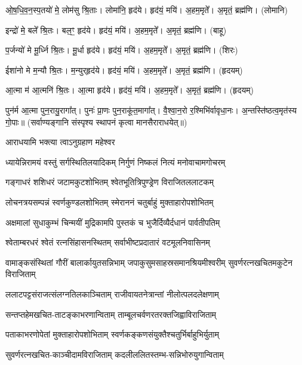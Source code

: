   ओ॒ष॒धि॒व॒न॒स्प॒तयो॑ मे॒ लोम॑सु श्रि॒ताः। लोमा॑नि॒ हृद॑ये। हृद॑यं॒ मयि॑। अ॒हम॒मृते᳚। अ॒मृतं॒ ब्रह्म॑णि। (लोमानि)

  इन्द्रो॑ मे॒ बले᳚ श्रि॒तः। बल॒ꣳ॒ हृद॑ये। हृद॑यं॒ मयि॑। अ॒हम॒मृते᳚। अ॒मृतं॒ ब्रह्म॑णि। (बाहू)

  प॒र्जन्यो॑ मे मू॒र्ध्नि श्रि॒तः। मू॒र्धा हृद॑ये। हृद॑यं॒ मयि॑। अ॒हम॒मृते᳚। अ॒मृतं॒ ब्रह्म॑णि। (शिरः)

  ईशा॑नो मे म॒न्यौ श्रि॒तः। म॒न्युर्‌हृद॑ये। हृद॑यं॒ मयि॑। अ॒हम॒मृते᳚। अ॒मृतं॒ ब्रह्म॑णि। (हृदयम्)

  आ॒त्मा म॑ आ॒त्मनि॑ श्रि॒तः। आ॒त्मा हृद॑ये। हृद॑यं॒ मयि॑। अ॒हम॒मृते᳚। अ॒मृतं॒ ब्रह्म॑णि।
(हृदयम्)

  पुन॑र्म आ॒त्मा पुन॒रायु॒रागा᳚त्। पुनः॑ प्रा॒णः पुन॒राकू॑त॒मागा᳚त्। वै॒श्वा॒न॒रो र॒श्मिभि॑र्वावृधा॒नः। अ॒न्तस्ति॑ष्ठत्व॒मृत॑स्य गो॒पाः॥ (सर्वाण्यङ्गानि संस्पृश्य स्थापनं कृत्वा मानसैराराधयेत्॥)

{\small\closesection}


{आराधयामि भक्त्या त्वाऽनुग्रहाण महेश्वर}



\twolineshloka
{ध्यायेन्निरामयं वस्तुं सर्गस्थितिलयादिकम्}
{निर्गुणं निष्कलं नित्यं मनोवाचामगोचरम्}

\twolineshloka
{गङ्गाधरं शशिधरं जटामकुटशोभितम्}
{श्वेतभूतित्रिपुण्ड्रेण विराजितललाटकम्}

\twolineshloka
{लोचनत्रयसम्पन्नं स्वर्णकुण्डलशोभितम्}
{स्मेराननं चतुर्बाहुं मुक्ताहारोपशोभितम्}

\twolineshloka
{अक्षमालां सुधाकुम्भं चिन्मयीं मुद्रिकामपि}
{पुस्तकं च भुजैर्दिव्यैर्दधानं पार्वतीपतिम्}

\twolineshloka
{श्वेताम्बरधरं श्वेतं रत्नसिंहासनस्थितम्}
{सर्वाभीष्टप्रदातारं वटमूलनिवासिनम्}

\threelineshloka
{वामाङ्कसंस्थितां गौरीं बालार्कायुतसन्निभाम्}
{जपाकुसुमसाहस्रसमानश्रियमीश्वरीम्}
{सुवर्णरत्नखचितमकुटेन विराजिताम्}

\twolineshloka
{ललाटपट्टसंराजत्संलग्नतिलकाञ्चिताम्}
{राजीवायतनेत्रान्तां नीलोत्पलदलेक्षणाम्}

\twolineshloka
{सन्तप्तहेमखचित-ताटङ्काभरणान्विताम्}
{ताम्बूलचर्वणरतरक्तजिह्वाविराजिताम्}

\twolineshloka
{पताकाभरणोपेतां मुक्ताहारोपशोभिताम्}
{स्वर्णकङ्कणसंयुक्तैश्चतुर्भिर्बाहुभिर्युताम्}

\twolineshloka
{सुवर्णरत्नखचित-काञ्चीदामविराजिताम्}
{कदलीललितस्तम्भ-सन्निभोरुयुगान्विताम्}

